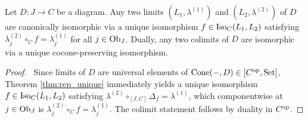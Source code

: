 \documentclass[10pt,a4paper]{article}
\renewcommand{\myprf}{\begin{proof}}
\renewcommand{\myqed}{\end{proof}}
\begin{document}
\begin{theorem}\label{thm:limit_unique}
Let $D : J \to C$ be a diagram. Any two limits $(L_1, \lambda^{(1)})$ and $(L_2, \lambda^{(2)})$ of $D$ are canonically isomorphic via a unique isomorphism $f \in {\mathrm{Iso}}_C(L_1, L_2)$ satisfying $\lambda^{(2)}_j \circ_C f = \lambda^{(1)}_j$ for all $j \in {\textrm{Ob}}_J$. Dually, any two colimits of $D$ are isomorphic via a unique cocone-preserving isomorphism.
\end{theorem}
\myprf\ Since limits of $D$ are universal elements of ${\mathrm{Cone}}(-, D) \in [C^{\textrm{op}}, {\textrm{Set}}]$, Theorem \ref{thm:rep_unique} immediately yields a unique isomorphism $f \in {\mathrm{Iso}}_C(L_1, L_2)$ satisfying $\lambda^{(2)} \circ_{[J,C]} \Delta_f = \lambda^{(1)}$, which componentwise at $j \in {\textrm{Ob}}_J$ is $\lambda^{(2)}_j \circ_C f = \lambda^{(1)}_j$. The colimit statement follows by duality in $C^{\textrm{op}}$. \myqed
\end{document}
